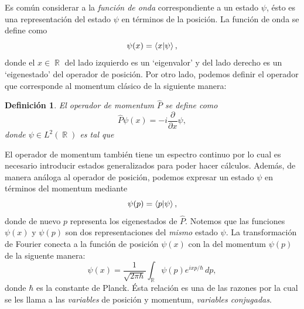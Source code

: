 \documentclass[a4paper]{report}
\DeclareMathOperator{\R}{\mathbb{R}}
\newtheorem{definition}{Definición}
\begin{document}
  Es común considerar a la \textit{función de onda}
  correspondiente a un estado $\psi$, ésto es una
  representación del estado $\psi$ en términos de la
  posición. La función de onda se define como
  \[
    \psi(x)
    = \braket{x| \psi},
  \] 
  donde el $x \in \R$ del lado izquierdo es un `eigenvalor'
  y del lado derecho es un `eigenestado' del operador de
  posición. Por otro lado, podemos definir el operador que
  corresponde al momentum clásico de la siguiente manera:
  \begin{definition}
    El operador de momentum $\hat P$ se define como
    \[
      \hat P\psi(x) = -i \frac{\partial}{\partial x} \psi,
    \] 
    donde $\psi \in L^2(\R)$ es tal que
  \end{definition}
  El operador de momentum también tiene un espectro continuo
  por lo cual es necesario introducir estados generalizados
  para poder hacer cálculos. Además, de manera análoga al
  operador de posición, podemos expresar un estado $\psi$ en
  términos del momentum mediante
  \[
    \psi(p) = \braket{p| \psi},
  \] 
  donde de nuevo $p$ representa los eigenestados de $\hat
  P$. Notemos que las funciones $\psi(x)$ y $\psi(p)$ son
  dos representaciones del \textit{mismo} estado $\psi$.  La
  transformación de Fourier conecta a la función de posición
  $\psi(x)$ con la del momentum $\psi(p)$ de la siguente
  manera:
  \begin{equation}
    \psi(x)
    = \frac{1}{\sqrt{2\pi\hbar}} \int_{\R} \psi(p)e^{ixp /
    \hbar} \, dp,
  \end{equation} 
  donde $\hbar$ es la constante de Planck. Ésta relación es
  una de las razones por la cual se les llama a las
  \textit{variables} de posición y momentum,
  \textit{variables conjugadas}.
\end{document}
